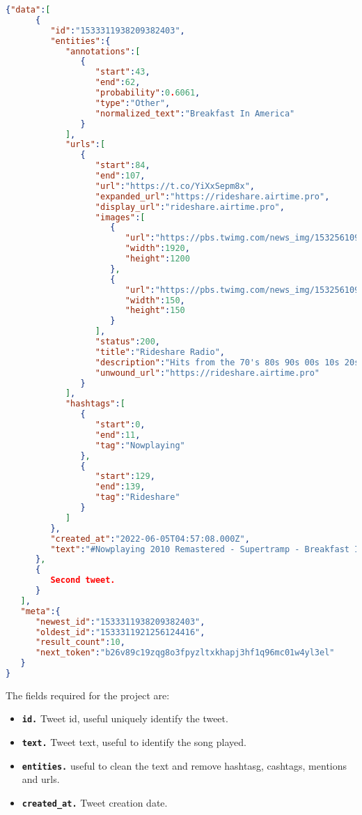 \begin{lstlisting}[language=json,firstnumber=1]
{"data":[
      {
         "id":"1533311938209382403",
         "entities":{
            "annotations":[
               {
                  "start":43,
                  "end":62,
                  "probability":0.6061,
                  "type":"Other",
                  "normalized_text":"Breakfast In America"
               }
            ],
            "urls":[
               {
                  "start":84,
                  "end":107,
                  "url":"https://t.co/YiXxSepm8x",
                  "expanded_url":"https://rideshare.airtime.pro",
                  "display_url":"rideshare.airtime.pro",
                  "images":[
                     {
                        "url":"https://pbs.twimg.com/news_img/1532561096858640397/3mUiSDDN?format=jpg&name=orig",
                        "width":1920,
                        "height":1200
                     },
                     {
                        "url":"https://pbs.twimg.com/news_img/1532561096858640397/3mUiSDDN?format=jpg&name=150x150",
                        "width":150,
                        "height":150
                     }
                  ],
                  "status":200,
                  "title":"Rideshare Radio",
                  "description":"Hits from the 70's 80s 90s 00s 10s 20s, No Talking just back to back Music totally commercials free 24/7",
                  "unwound_url":"https://rideshare.airtime.pro"
               }
            ],
            "hashtags":[
               {
                  "start":0,
                  "end":11,
                  "tag":"Nowplaying"
               },
               {
                  "start":129,
                  "end":139,
                  "tag":"Rideshare"
               }
            ]
         },
         "created_at":"2022-06-05T04:57:08.000Z",
         "text":"#Nowplaying 2010 Remastered - Supertramp - Breakfast In America  - Stream here-&gt; https://t.co/YiXxSepm8x - Non Stop Hits 24/7 #Rideshare #Radio #Hits #Uber #RideshareRadio #Petrol #Parcoursup #PlatinumJubilee #ENGvNZ #PrideMonth"
      },
      {
         Second tweet.      
      }
   ],
   "meta":{
      "newest_id":"1533311938209382403",
      "oldest_id":"1533311921256124416",
      "result_count":10,
      "next_token":"b26v89c19zqg8o3fpyzltxkhapj3hf1q96mc01w4yl3el"
   }
}
\end{lstlisting}

\nonzeroparskip The fields required for the project are:
\begin{itemize}
	\item \textbf{\texttt{id.}} Tweet id, useful uniquely identify the tweet.
	\item \textbf{\texttt{text.}} Tweet text, useful to identify the song played.
	\item \textbf{\texttt{entities.}} useful to clean the text and remove hashtasg, cashtags, mentions and urls.
	\item \textbf{\texttt{created\_at.}} Tweet creation date.
\end{itemize}

